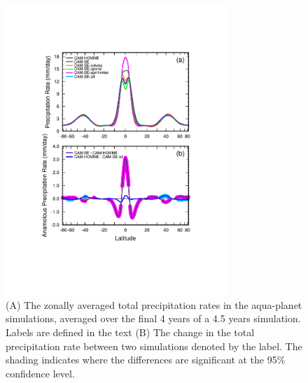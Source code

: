 \documentclass{agujournal}
\begin{document}
\begin{figure}[h]
\centering
\includegraphics[width=20pc]{figs/dzonal_prect.pdf}
\caption{(A) The zonally averaged total precipitation rates in the aqua-planet simulations, averaged over the final 4 years of a 4.5 years simulation. Labels are defined in the text (B) The change in the total precipitation rate between two simulations denoted by the label. The shading indicates where the differences are significant at the 95\% confidence level.}
\label{fig:dzonal}
\end{figure}
\end{document}
